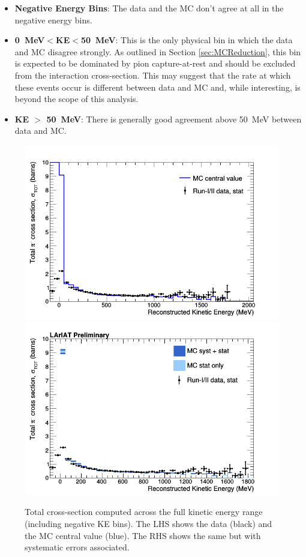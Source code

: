 \begin{itemize}
\item \textbf{Negative Energy Bins}: The data and the MC don't agree at all in the negative energy bins.

\item \textbf{0~MeV$<$KE$<$50~MeV}: This is the only physical bin in which the data and MC disagree strongly. As outlined in Section \ref{sec:MCReduction}, this bin is expected to be dominated by pion capture-at-rest and should be excluded from the interaction cross-section. This may suggest that the rate at which these events occur is different between data and MC and, while interesting, is beyond the scope of this analysis.

\item \textbf{KE $>$ 50~MeV}: There is generally good agreement above 50~MeV between data and MC.

\end{itemize}

\begin{figure}[h!]
\centering
\includegraphics[scale=0.30]{./images/CombinedNegPol_xsec_MC_noband_fineBin.png}
\includegraphics[scale=0.30]{./images/CombinedNegPol_xsec_MCband_opt2FineBin.png}
\caption{Total cross-section computed across the full kinetic energy range (including negative KE bins). The LHS shows the data (black) and the MC central value (blue). The RHS shows the same but with systematic errors associated. }
\label{fig:RawCrossSection}
\end{figure}

